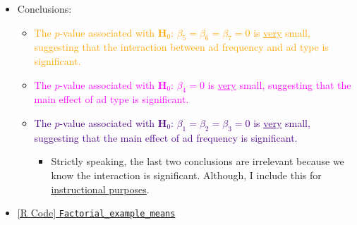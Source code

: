 \begin{itemize}
      \item Conclusions:
            \begin{itemize}
                  \item \textcolor{Orange}{The $ p $-value associated with $ \mathbf{H}_0 $: $ \beta_5=\beta_6=\beta_7=0 $ is \underline{very} small, suggesting that the interaction
                              between ad frequency and ad type is significant.}
                  \item \textcolor{Fuchsia}{The $ p $-value associated with $ \mathbf{H}_0 $: $ \beta_4=0 $ is \underline{very} small, suggesting that the main effect of ad type is significant.}
                  \item \textcolor{Indigo}{The $ p $-value associated with $ \mathbf{H}_0 $: $ \beta_1=\beta_2=\beta_3=0 $ is \underline{very} small, suggesting that the main effect of ad frequency is significant.}
                        \begin{itemize}
                              \item Strictly speaking, the last two conclusions are irrelevant because we know the interaction is significant. Although, I include this for \underline{instructional purposes}.
                        \end{itemize}
            \end{itemize}
      \item \href{https://github.com/Hextical/university-notes/blob/master/year-3/semester-3/STAT 430/code/W7/Factorial_example_means.R}{[R Code] \texttt{Factorial\_example\_means}}
\end{itemize}
